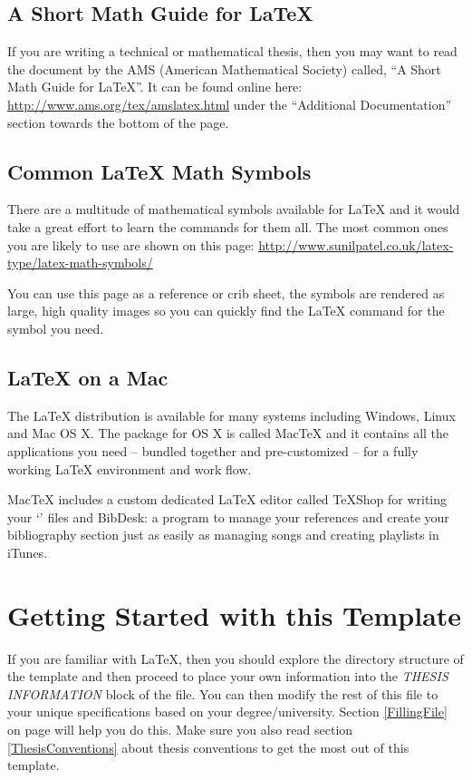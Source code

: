 \subsection{A Short Math Guide for \LaTeX{}}

If you are writing a technical or mathematical thesis, then you may want to read the document by the AMS (American Mathematical Society) called, \enquote{A Short Math Guide for \LaTeX{}}. It can be found online here:
\url{http://www.ams.org/tex/amslatex.html}
under the \enquote{Additional Documentation} section towards the bottom of the page.

\subsection{Common \LaTeX{} Math Symbols}
There are a multitude of mathematical symbols available for \LaTeX{} and it would take a great effort to learn the commands for them all. The most common ones you are likely to use are shown on this page:
\url{http://www.sunilpatel.co.uk/latex-type/latex-math-symbols/}

You can use this page as a reference or crib sheet, the symbols are rendered as large, high quality images so you can quickly find the \LaTeX{} command for the symbol you need.

\subsection{\LaTeX{} on a Mac}
 
The \LaTeX{} distribution is available for many systems including Windows, Linux and Mac OS X. The package for OS X is called MacTeX and it contains all the applications you need -- bundled together and pre-customized -- for a fully working \LaTeX{} environment and work flow.
 
MacTeX includes a custom dedicated \LaTeX{} editor called TeXShop for writing your `' files and BibDesk: a program to manage your references and create your bibliography section just as easily as managing songs and creating playlists in iTunes.


\section{Getting Started with this Template}

If you are familiar with \LaTeX{}, then you should explore the directory structure of the template and then proceed to place your own information into the \emph{THESIS INFORMATION} block of the  file. You can then modify the rest of this file to your unique specifications based on your degree/university. Section \ref{FillingFile} on page \pageref{FillingFile} will help you do this. Make sure you also read section \ref{ThesisConventions} about thesis conventions to get the most out of this template.

